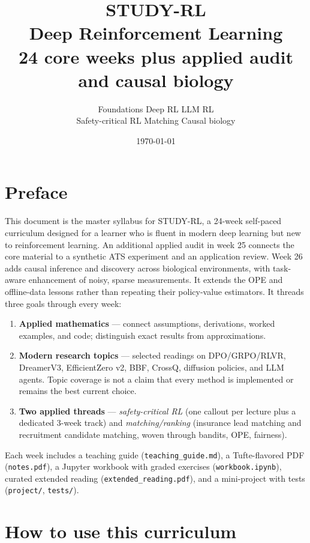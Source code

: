 \documentclass[11pt,oneside]{scrbook}
\title{{\color{rlblue}\textbf{STUDY-RL}}\\\Huge Deep Reinforcement Learning\\\Large 24 core weeks plus applied audit and causal biology}
\author{Foundations \textperiodcentered{} Deep RL \textperiodcentered{} LLM RL \\ Safety-critical RL \textperiodcentered{} Matching \textperiodcentered{} Causal biology}
\date{\today}
\begin{document}
\maketitle
\tableofcontents
\newpage

\chapter*{Preface}

This document is the master syllabus for \textsc{STUDY-RL}, a 24-week self-paced curriculum
designed for a learner who is fluent in modern deep learning but new to reinforcement learning.
An additional applied audit in week 25 connects the core material to a synthetic
ATS experiment and an application review. Week 26 adds causal inference and
discovery across biological environments, with task-aware enhancement of noisy,
sparse measurements. It extends the OPE and offline-data lessons rather than
repeating their policy-value estimators.
It threads three goals through every week:
\begin{enumerate}
  \item \textbf{Applied mathematics} --- connect assumptions, derivations, worked examples, and code; distinguish exact results from approximations.
  \item \textbf{Modern research topics} --- selected readings on DPO/GRPO/RLVR, DreamerV3, EfficientZero v2, BBF, CrossQ, diffusion policies, and LLM agents. Topic coverage is not a claim that every method is implemented or remains the best current choice.
  \item \textbf{Two applied threads} — \emph{safety-critical RL} (one callout per lecture plus a dedicated 3-week track) and \emph{matching/ranking} (insurance lead matching and recruitment candidate matching, woven through bandits, OPE, fairness).
\end{enumerate}

Each week includes a teaching guide (\texttt{teaching\_guide.md}), a Tufte-flavored PDF (\texttt{notes.pdf}), a Jupyter
workbook with graded exercises (\texttt{workbook.ipynb}), curated extended reading
(\texttt{extended\_reading.pdf}), and a mini-project with tests (\texttt{project/}, \texttt{tests/}).

\chapter*{How to use this curriculum}
\end{document}
